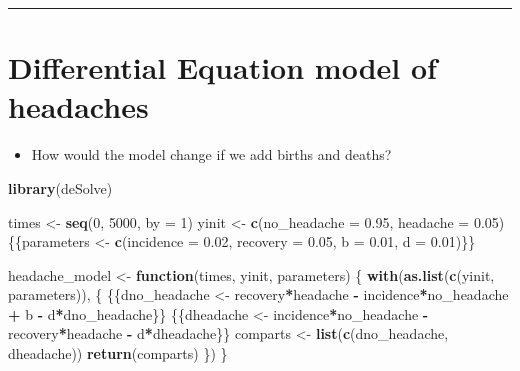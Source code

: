\documentclass[]{article}
\newenvironment{Shaded}{\begin{snugshade}}{\end{snugshade}}
\newcommand{\KeywordTok}[1]{\textcolor[rgb]{0.13,0.29,0.53}{\textbf{#1}}}
\newcommand{\DataTypeTok}[1]{\textcolor[rgb]{0.13,0.29,0.53}{#1}}
\newcommand{\DecValTok}[1]{\textcolor[rgb]{0.00,0.00,0.81}{#1}}
\newcommand{\FloatTok}[1]{\textcolor[rgb]{0.00,0.00,0.81}{#1}}
\newcommand{\StringTok}[1]{\textcolor[rgb]{0.31,0.60,0.02}{#1}}
\newcommand{\ControlFlowTok}[1]{\textcolor[rgb]{0.13,0.29,0.53}{\textbf{#1}}}
\newcommand{\OperatorTok}[1]{\textcolor[rgb]{0.81,0.36,0.00}{\textbf{#1}}}
\newcommand{\NormalTok}[1]{#1}
\providecommand{\tightlist}{%
  \setlength{\itemsep}{0pt}\setlength{\parskip}{0pt}}
\begin{document}
\begin{center}\rule{0.5\linewidth}{\linethickness}\end{center}

\section{Differential Equation model of
headaches}\label{differential-equation-model-of-headaches-2}

\begin{itemize}
\tightlist
\item
  How would the model change if we add births and deaths?
\end{itemize}

\begin{Shaded}
\begin{Highlighting}[]
\KeywordTok{library}\NormalTok{(deSolve)}

\NormalTok{times <-}\StringTok{ }\KeywordTok{seq}\NormalTok{(}\DecValTok{0}\NormalTok{, }\DecValTok{5000}\NormalTok{, }\DataTypeTok{by =} \DecValTok{1}\NormalTok{)}
\NormalTok{yinit <-}\StringTok{ }\KeywordTok{c}\NormalTok{(}\DataTypeTok{no_headache =} \FloatTok{0.95}\NormalTok{, }\DataTypeTok{headache =} \FloatTok{0.05}\NormalTok{)}
\NormalTok{\{\{parameters <-}\StringTok{ }\KeywordTok{c}\NormalTok{(}\DataTypeTok{incidence =} \FloatTok{0.02}\NormalTok{, }\DataTypeTok{recovery =} \FloatTok{0.05}\NormalTok{, }\DataTypeTok{b =} \FloatTok{0.01}\NormalTok{, }\DataTypeTok{d =} \FloatTok{0.01}\NormalTok{)\}\}}

\NormalTok{headache_model <-}\StringTok{ }\ControlFlowTok{function}\NormalTok{(times, yinit, parameters) \{}
    \KeywordTok{with}\NormalTok{(}\KeywordTok{as.list}\NormalTok{(}\KeywordTok{c}\NormalTok{(yinit, parameters)), \{}
\NormalTok{      \{\{dno_headache <-}\StringTok{ }\NormalTok{recovery}\OperatorTok{*}\NormalTok{headache }\OperatorTok{-}\StringTok{ }\NormalTok{incidence}\OperatorTok{*}\NormalTok{no_headache }\OperatorTok{+}\StringTok{ }\NormalTok{b }\OperatorTok{-}\StringTok{ }
\StringTok{       }\NormalTok{d}\OperatorTok{*}\NormalTok{dno_headache\}\}}
\NormalTok{     \{\{dheadache <-}\StringTok{ }\NormalTok{incidence}\OperatorTok{*}\NormalTok{no_headache }\OperatorTok{-}\StringTok{ }\NormalTok{recovery}\OperatorTok{*}\NormalTok{headache }\OperatorTok{-}\StringTok{ }\NormalTok{d}\OperatorTok{*}\NormalTok{dheadache\}\}}
\NormalTok{      comparts <-}\StringTok{ }\KeywordTok{list}\NormalTok{(}\KeywordTok{c}\NormalTok{(dno_headache, dheadache))}
      \KeywordTok{return}\NormalTok{(comparts)}
\NormalTok{    \})}
\NormalTok{\}}


\end{Highlighting}
\end{Shaded}
\end{document}
